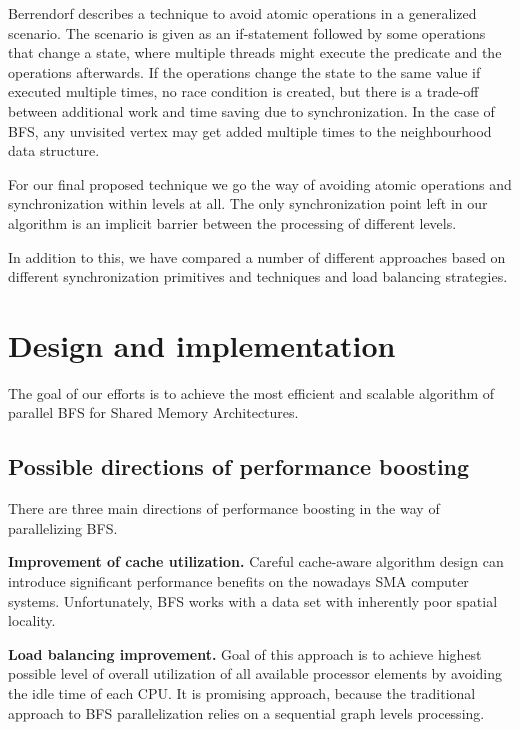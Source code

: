 \documentclass[letterpaper]{article}
\begin{document}
		Berrendorf\cite{Berrendorf:14} describes a technique to avoid atomic operations in a generalized scenario. 
		The scenario is given as an if-statement followed by some operations that change a state, where multiple threads might execute the predicate and the operations afterwards. 
		If the operations change the state to the same value if executed multiple times, no race condition is created, but there is a trade-off between additional work and time saving due to synchronization.
		In the case of BFS, any unvisited vertex may get added multiple times to the neighbourhood data structure.		
	
		For our final proposed technique we go the way of avoiding atomic operations and synchronization within levels at all.
		The only synchronization point left in our algorithm is an implicit barrier between the processing of different levels.
		
		In addition to this, we have compared a number of different approaches based on different synchronization primitives and techniques and load balancing strategies. %
	
	
	\section{Design and implementation}\label{sec:deim} %
		The goal of our efforts is to achieve the most efficient and scalable algorithm of parallel BFS for Shared Memory Architectures. 

		\subsection{Possible directions of performance boosting}
			There are three main directions of performance boosting in the way of parallelizing BFS.
			
			\textbf{Improvement of cache utilization.}
			Careful cache-aware algorithm design can introduce significant performance benefits on the nowadays SMA computer systems.
			Unfortunately,  BFS works with a data set with inherently poor spatial locality. 
			
			\textbf{Load balancing improvement.} 
			Goal of this approach is to achieve highest possible level of overall utilization of all available processor elements by avoiding the idle time of each CPU.
			It is promising approach, because the traditional approach to BFS parallelization relies on a sequential graph levels processing.
						
\end{document}
